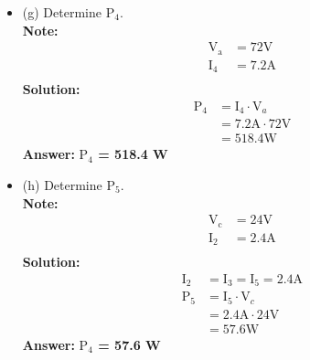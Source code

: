 \documentclass{article}
\begin{document}
\begin{itemize}
	\item (g) Determine $\text{P}_4$. \\
		\textbf{Note:}
		\begin{align*}
			\text{V}_\text{a} &= 72 \text{V} \\
			\text{I}_4 &= 7.2 \text{A} \\
		\end{align*}
		\textbf{Solution:}
		\begin{align*}
			\text{P}_4 &= \text{I}_4 \cdot \text{V}_a \\
			&= 7.2 \text{A} \cdot 72 \text{V} \\
			&= 518.4 \text{W}
		\end{align*}
		\textbf{Answer:} \textbf{$\text{P}_{4}$ = 518.4 W}
	\item (h) Determine $\text{P}_5$. \\
		\textbf{Note:}
		\begin{align*}
			\text{V}_\text{c} &= 24 \text{V} \\
			\text{I}_2 &= 2.4 \text{A} \\
		\end{align*}
		\textbf{Solution:}
		\begin{align*}
			\text{I}_2 &= \text{I}_3 = \text{I}_5 = 2.4 \text{A} \\
			\text{P}_5 &= \text{I}_5 \cdot \text{V}_c \\
			&= 2.4 \text{A} \cdot 24 \text{V} \\
			&= 57.6 \text{W}
		\end{align*}
		\textbf{Answer:} \textbf{$\text{P}_{4}$ = 57.6 W}
\end{itemize}

\newpage
\end{document}
